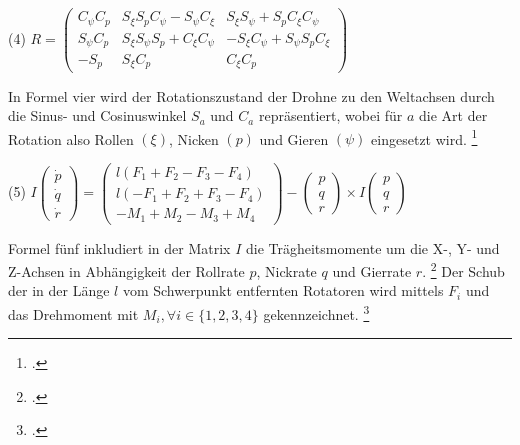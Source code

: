 \begin{description}
    \item \begin{center} (4) $R = \begin{pmatrix} C_{\psi}C_{p} & S_{\xi}S_{p}C_{\psi} - S_{\psi}C_{\xi} & S_{\xi}S_{\psi}+S_{p}C_{\xi}C_{\psi} \\ S_{\psi}C_{p} & S_{\xi}S_{\psi}S_{p} + C_{\xi}C_{\psi} &  -S_{\xi}C_{\psi} + S_{\psi}S_{p}C_{\xi}\\ -S_{p} & S_{\xi}C_{p} & C_{\xi}C_{p} \end{pmatrix}$ \end{center}
\end{description}
In Formel vier wird der Rotationszustand der Drohne zu den Weltachsen durch die Sinus- und Cosinuswinkel $S_{a}$ und $C_{a}$ repräsentiert, wobei für $a$ die Art der Rotation also Rollen $(\xi)$, Nicken $(p)$ und Gieren $(\psi)$ eingesetzt wird. \footcite[Vgl.][S. 2]{Deshpande.2021}
\begin{description}
    \item \begin{center} (5) $I\begin{pmatrix} \dot p \\ \dot q \\ \dot r\end{pmatrix} = \begin{pmatrix} l(F_{1} + F_{2} - F_{3} - F_{4}) \\ l(-F_{1} + F_{2} + F_{3} - F_{4}) \\ -M_{1} + M_{2} - M_{3} + M_{4}\end{pmatrix} - \begin{pmatrix} p \\ q \\ r \end{pmatrix} \times I\begin{pmatrix} p \\ q \\ r \end{pmatrix}$ \end{center}
\end{description}
Formel fünf inkludiert in der Matrix $I$ die Trägheitsmomente um die X-, Y- und Z-Achsen in Abhängigkeit der Rollrate $p$, Nickrate $q$ und Gierrate $r$. \footcite[Vgl.][S. 2]{Deshpande.2021}
Der Schub der in der Länge $l$ vom Schwerpunkt entfernten Rotatoren wird mittels $F_{i}$ und das Drehmoment mit $M_{i}, \forall i \in \{1,2,3,4\}$ gekennzeichnet. \footcite[Vgl.][S. 3]{Deshpande.2020}
